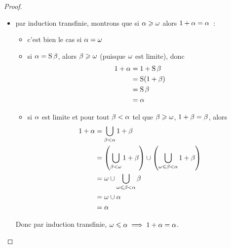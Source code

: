 \begin{proof}
\begin{itemize}
\begin{itemize}
\begin{align*}
        &= (\varOa\times\varOb) \times \varOc
      \end{align*}
    \end{itemize}
  \item par induction transfinie, montrons que si $\alpha \geqslant \omega$ alors
    $1 + \alpha = \alpha$~:
    \begin{itemize}
    \item c'est bien le cas si $\alpha = \omega$
    \item si $\alpha = \operatorname{S}\beta$, alors $\beta \geqslant \omega$ (puisque $\omega$
      est limite), donc
      \begin{align*}
        1+\alpha &= 1 + \operatorname{S}\beta \\
        &= \operatorname{S}(1 + \beta) \\
        &= \operatorname{S}\beta\\
        &= \alpha
      \end{align*}
    \item si $\alpha$ est limite et pour tout $\beta < \alpha$ tel que
      $\beta \geqslant \omega$, $1+\beta = \beta$, alors
      \begin{align*}
        1 + \alpha &= \bigcup_{\beta < \alpha} 1 + \beta \\
        &= \left(\bigcup_{\beta < \omega} 1 + \beta\right) \cup
        \left(\bigcup_{\omega \leqslant \beta < \alpha} 1 + \beta\right)\\
        &= \omega \cup \bigcup_{\omega\leqslant\beta < \alpha} \beta\\
        &= \omega \cup \alpha\\
        &= \alpha
      \end{align*}
    \end{itemize}
    Donc par induction transfinie,
    $\omega \leqslant \alpha \implies 1 + \alpha = \alpha$.


\end{itemize}
\end{proof}
